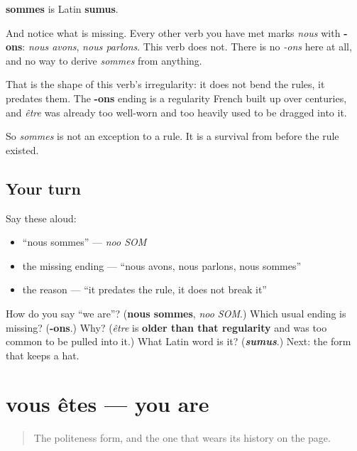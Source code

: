 \begin{cousinweb}
\textbf{sommes} is Latin \textbf{sumus}.

And notice what is missing. Every other verb you have met marks \emph{nous} with \textbf{-ons}: \emph{nous avons}, \emph{nous parlons}. This verb does not. There is no \emph{-ons} here at all, and no way to derive \emph{sommes} from anything.

That is the shape of this verb's irregularity: it does not bend the rules, it predates them. The \textbf{-ons} ending is a regularity French built up over centuries, and \emph{être} was already too well-worn and too heavily used to be dragged into it.

So \emph{sommes} is not an exception to a rule. It is a survival from before the rule existed.
\end{cousinweb}

\subsection*{Your turn}
Say these aloud:

\begin{itemize}
\raggedright
  \item \textquotedblleft{}nous sommes\textquotedblright{} — \emph{noo SOM}
  \item the missing ending — \textquotedblleft{}nous avons, nous parlons, nous sommes\textquotedblright{}
  \item the reason — \textquotedblleft{}it predates the rule, it does not break it\textquotedblright{}
\end{itemize}

\begin{tcolorbox}[breakable,colback=teal!4,colframe=teal!35!black,title={Before you move on}]
How do you say \textquotedblleft{}we are\textquotedblright{}? (\textbf{nous sommes}, \emph{noo SOM}.) Which usual ending is missing? (\textbf{-ons}.) Why? (\emph{être} is \textbf{older than that regularity} and was too common to be pulled into it.) What Latin word is it? (\emph{\textbf{sumus}}.) Next: the form that keeps a hat.
\end{tcolorbox}
\section[vous êtes]{vous êtes — you are}

\label{lesson:FR-C16-etes}



\begin{quote}
The politeness form, and the one that wears its history on the page.
\end{quote}

